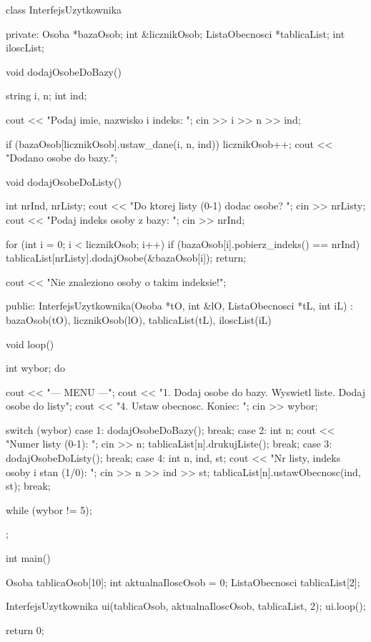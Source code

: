 class InterfejsUzytkownika {
private:
    Osoba *bazaOsob;
    int &licznikOsob;
    ListaObecnosci *tablicaList;
    int iloscList;

    void dodajOsobeDoBazy() {
        string i, n;
        int ind;

        cout << "Podaj imie, nazwisko i indeks: ";
        cin >> i >> n >> ind;

        if (bazaOsob[licznikOsob].ustaw_dane(i, n, ind)) {
            licznikOsob++;
            cout << "Dodano osobe do bazy.\n";
        }
    }

    void dodajOsobeDoListy() {
        int nrInd, nrListy;
        cout << "Do ktorej listy (0-1) dodac osobe? ";
        cin >> nrListy;
        cout << "Podaj indeks osoby z bazy: ";
        cin >> nrInd;

        for (int i = 0; i < licznikOsob; i++) {
            if (bazaOsob[i].pobierz_indeks() == nrInd) {
                tablicaList[nrListy].dodajOsobe(&bazaOsob[i]);
                return;
            }
        }

        cout << "Nie znaleziono osoby o takim indeksie!\n";
    }

public:
    InterfejsUzytkownika(Osoba *tO, int &lO, ListaObecnosci *tL, int iL)
        : bazaOsob(tO), licznikOsob(lO), tablicaList(tL), iloscList(iL) {}

    void loop() {
        int wybor;
        do {
            cout << "\n--- MENU ---\n";
            cout << "1. Dodaj osobe do bazy. Wyswietl liste. Dodaj osobe do listy\n";
            cout << "4. Ustaw obecnosc. Koniec\nWybor: ";
            cin >> wybor;

            switch (wybor) {
                case 1:
                    dodajOsobeDoBazy();
                    break;
                case 2: {
                    int n;
                    cout << "Numer listy (0-1): ";
                    cin >> n;
                    tablicaList[n].drukujListe();
                    break;
                }
                case 3:
                    dodajOsobeDoListy();
                    break;
                case 4: {
                    int n, ind, st;
                    cout << "Nr listy, indeks osoby i stan (1/0): ";
                    cin >> n >> ind >> st;
                    tablicaList[n].ustawObecnosc(ind, st);
                    break;
                }
            }
        } while (wybor != 5);
    }
};


int main() {
    Osoba tablicaOsob[10];
    int aktualnaIloscOsob = 0;
    ListaObecnosci tablicaList[2];

    InterfejsUzytkownika ui(tablicaOsob, aktualnaIloscOsob, tablicaList, 2);
    ui.loop();

    return 0;
}